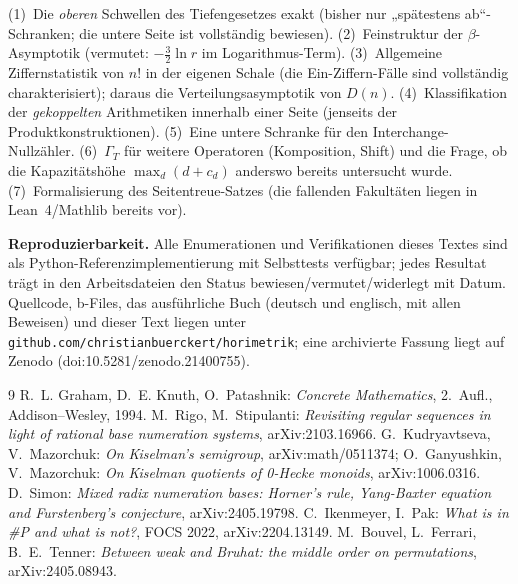 \documentclass[11pt]{article}
\theoremstyle{definition}
\theoremstyle{remark}
\begin{document}
(1)~Die \emph{oberen} Schwellen des Tiefengesetzes exakt (bisher
nur „spätestens ab“-Schranken; die untere Seite ist vollständig
bewiesen). (2)~Feinstruktur der $\beta$-Asymptotik (vermutet:
$-\tfrac32\ln r$ im Logarithmus-Term). (3)~Allgemeine
Ziffernstatistik von $n!$ in der eigenen Schale (die Ein-Ziffern-Fälle
sind vollständig charakterisiert); daraus die Verteilungsasymptotik
von $D(n)$. (4)~Klassifikation der \emph{gekoppelten} Arithmetiken
innerhalb einer Seite (jenseits der Produktkonstruktionen).
(5)~Eine untere Schranke für den Interchange-Nullzähler.
(6)~$\Gamma_T$ für weitere Operatoren (Komposition, Shift) und die
Frage, ob die Kapazitätshöhe $\max_d(d+c_d)$ anderswo bereits
untersucht wurde. (7)~Formalisierung des Seitentreue-Satzes (die
fallenden Fakultäten liegen in Lean~4/Mathlib bereits vor).

\bigskip
\noindent\textbf{Reproduzierbarkeit.} Alle Enumerationen und
Verifikationen dieses Textes sind als Python-Referenz\-implementierung
mit Selbsttests verfügbar; jedes Resultat trägt in den Arbeitsdateien
den Status bewiesen/vermutet/widerlegt mit Datum. Quellcode,
b-Files, das ausführliche Buch (deutsch und englisch, mit allen
Beweisen) und dieser Text liegen unter
\texttt{github.com/christianbuerckert/horimetrik}; eine archivierte
Fassung liegt auf Zenodo (doi:10.5281/zenodo.21400755).

\begin{thebibliography}{9}
 R.~L. Graham, D.~E. Knuth, O.~Patashnik:
\emph{Concrete Mathematics}, 2.~Aufl., Addison--Wesley, 1994.
 M.~Rigo, M.~Stipulanti: \emph{Revisiting regular
sequences in light of rational base numeration systems},
arXiv:2103.16966.
 G.~Kudryavtseva, V.~Mazorchuk: \emph{On
Kiselman's semigroup}, arXiv:math/0511374; O.~Ganyushkin,
V.~Mazorchuk: \emph{On Kiselman quotients of 0-Hecke monoids},
arXiv:1006.0316.
 D.~Simon: \emph{Mixed radix numeration bases:
Horner's rule, Yang-Baxter equation and Furstenberg's conjecture},
arXiv:2405.19798.
 C.~Ikenmeyer, I.~Pak: \emph{What is in \#P
and what is not?}, FOCS 2022, arXiv:2204.13149.
 M.~Bouvel, L.~Ferrari, B.~E.~Tenner:
\emph{Between weak and Bruhat: the middle order on permutations},
arXiv:2405.08943.
\end{thebibliography}
\end{document}

